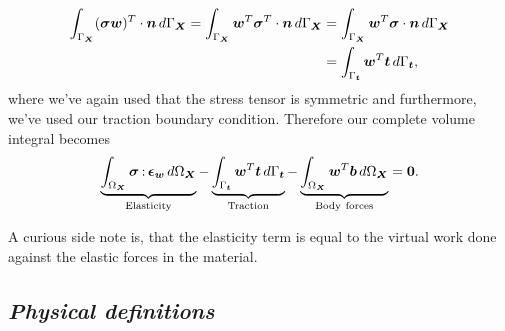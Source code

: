 \documentclass[acmtog]{acmart}
\newcommand{\ddotproduct}[2]{#1 \hspace{-1pt}:\hspace{-1pt} #2}
\begin{document}
%
\begin{align}
  \int_{\Gamma_{\boldsymbol X}} (\boldsymbol \sigma \boldsymbol w)^T \cdot\boldsymbol n \, d\Gamma_{\boldsymbol X} = \int_{\Gamma_{\boldsymbol X}} \boldsymbol w^T \boldsymbol \sigma^T \cdot\boldsymbol n \, d\Gamma_{\boldsymbol X} & = \int_{\Gamma_{\boldsymbol X}} \boldsymbol w^T \boldsymbol \sigma \cdot\boldsymbol n \, d\Gamma_{\boldsymbol X} \notag\\
                                                                                                                                                                                                                                      & = \int_{\Gamma_{\boldsymbol t}} \boldsymbol w^T \boldsymbol t \, d\Gamma_{\boldsymbol t},
\end{align}
%
where we've again used that the stress tensor is symmetric and furthermore, we've used our traction boundary condition. Therefore our complete volume integral becomes
%
\begin{equation}
  \underbrace{ \int_{\Omega_{\boldsymbol X}} \ddotproduct{\boldsymbol \sigma}{\boldsymbol \epsilon_{\boldsymbol w}} \, d\Omega_{\boldsymbol X} }_{ \mathrm{Elasticity} } - \underbrace{ \int_{\Gamma_{\boldsymbol t}} \boldsymbol w^T \boldsymbol t \, d\Gamma_{\boldsymbol t} }_{ \mathrm{Traction} } - \underbrace{ \int_{\Omega_{\boldsymbol X}} \boldsymbol w^T \boldsymbol b \, d\Omega_{\boldsymbol X} }_{ \mathrm{Body\ forces}  } = \boldsymbol 0.
\end{equation}
%

A curious side note is, that the elasticity term is equal to the virtual work done against the elastic forces in the material.

\subsection*{\textit{Physical definitions}}
\end{document}
